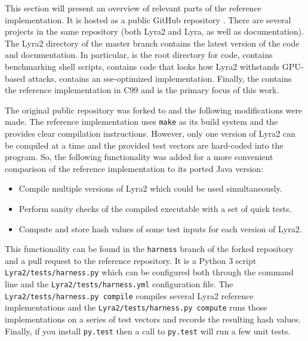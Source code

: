 This section will present an overview of relevant parts of the reference implementation. It is hosted as a public GitHub repository \cite{github:2017:lyra}. There are several projects in the same repository (both Lyra2 and Lyra, as well as documentation). The Lyra2 directory of the master branch contains the latest version of the code and documentation. In particular,  is the root directory for code,  contains benchmarking shell scripts,  contains code that looks how Lyra2 withstands GPU-based attacks,  contains an sse-optimized implementation. Finally, the  contains the reference implementation in C99 and is the primary focus of this work.

The original public repository \cite{github:2017:lyra} was forked to \cite{github:2017:lyra-copy} and the following modifications were made. The reference implementation uses \texttt{make} as its build system and the  provides clear compilation instructions. However, only one version of Lyra2 can be compiled at a time and the provided test vectors are hard-coded into the program. So, the following functionality was added for a more convenient comparison of the reference implementation to its ported Java version:

\begin{itemize}
    \item Compile multiple versions of Lyra2 which could be used simultaneously.
    \item Perform sanity checks of the compiled executable with a set of quick tests.
    \item Compute and store hash values of some test inputs for each version of Lyra2.
  \end{itemize}

This functionality can be found in the \texttt{harness} branch of the forked repository \cite{github:2017:lyra-copy} and a pull request \cite{github:2017:lyra-pr} to the reference repository. It is a Python 3 script \texttt{Lyra2/tests/harness.py} which can be configured both through the command line and the \texttt{Lyra2/tests/harness.yml} configuration file. The \texttt{Lyra2/tests/harness.py compile} compiles several Lyra2 reference implementations and the \texttt{Lyra2/tests/harness.py compute} runs those implementations on a series of test vectors and records the resulting hash values. Finally, if you install \texttt{py.test} then a call to \texttt{py.test} will run a few unit tests.

